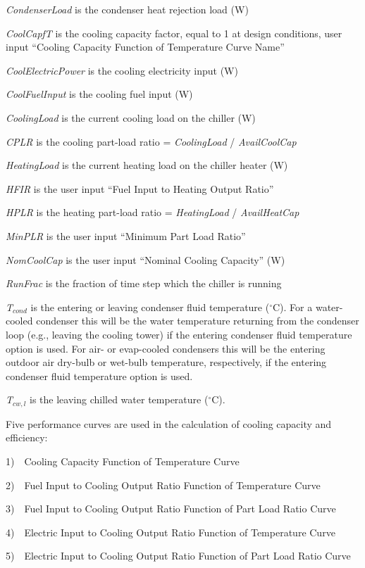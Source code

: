 \emph{CondenserLoad} is the condenser heat rejection load (W)

\emph{CoolCapfT} is the cooling capacity factor, equal to 1 at design conditions, user input ``Cooling Capacity Function of Temperature Curve Name''

\emph{CoolElectricPower} is the cooling electricity input (W)

\emph{CoolFuelInput} is the cooling fuel input (W)

\emph{CoolingLoad} is the current cooling load on the chiller (W)

\emph{CPLR} is the cooling part-load ratio = \emph{CoolingLoad} / \emph{AvailCoolCap}

\emph{HeatingLoad} is the current heating load on the chiller heater (W)

\emph{HFIR} is the user input ``Fuel Input to Heating Output Ratio''

\emph{HPLR} is the heating part-load ratio = \emph{HeatingLoad} / \emph{AvailHeatCap}

\emph{MinPLR} is the user input ``Minimum Part Load Ratio''

\emph{NomCoolCap} is the user input ``Nominal Cooling Capacity'' (W)

\emph{RunFrac} is the fraction of time step which the chiller is running

\emph{T\(_{cond}\)} is the entering or leaving condenser fluid temperature (\(^{\circ}\)C). For a water-cooled condenser this will be the water temperature returning from the condenser loop (e.g., leaving the cooling tower) if the entering condenser fluid temperature option is used. For air- or evap-cooled condensers this will be the entering outdoor air dry-bulb or wet-bulb temperature, respectively, if the entering condenser fluid temperature option is used.

\emph{T\(_{cw,l}\)} is the leaving chilled water temperature (\(^{\circ}\)C).

Five performance curves are used in the calculation of cooling capacity and efficiency:

1)~~Cooling Capacity Function of Temperature Curve

2)~~Fuel Input to Cooling Output Ratio Function of Temperature Curve

3)~~Fuel Input to Cooling Output Ratio Function of Part Load Ratio Curve

4)~~Electric Input to Cooling Output Ratio Function of Temperature Curve

5)~~Electric Input to Cooling Output Ratio Function of Part Load Ratio Curve

